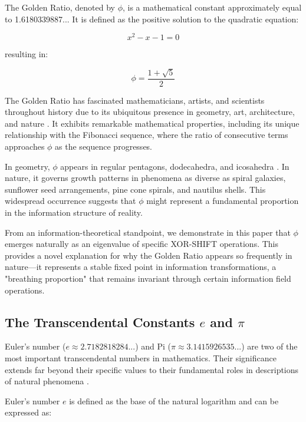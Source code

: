 The Golden Ratio, denoted by $\phi$, is a mathematical constant approximately equal to 1.6180339887... It is defined as the positive solution to the quadratic equation:

\begin{equation}
x^2 - x - 1 = 0
\end{equation}

resulting in:

\begin{equation}
\phi = \frac{1 + \sqrt{5}}{2}
\end{equation}

The Golden Ratio has fascinated mathematicians, artists, and scientists throughout history due to its ubiquitous presence in geometry, art, architecture, and nature \cite{livio2002golden}. It exhibits remarkable mathematical properties, including its unique relationship with the Fibonacci sequence, where the ratio of consecutive terms approaches $\phi$ as the sequence progresses.

In geometry, $\phi$ appears in regular pentagons, dodecahedra, and icosahedra \cite{weyl1952symmetry}. In nature, it governs growth patterns in phenomena as diverse as spiral galaxies, sunflower seed arrangements, pine cone spirals, and nautilus shells. This widespread occurrence suggests that $\phi$ might represent a fundamental proportion in the information structure of reality.

From an information-theoretical standpoint, we demonstrate in this paper that $\phi$ emerges naturally as an eigenvalue of specific XOR-SHIFT operations. This provides a novel explanation for why the Golden Ratio appears so frequently in nature—it represents a stable fixed point in information transformations, a "breathing proportion" that remains invariant through certain information field operations.

\subsection{The Transcendental Constants $e$ and $\pi$}

Euler's number ($e \approx 2.7182818284...$) and Pi ($\pi \approx 3.1415926535...$) are two of the most important transcendental numbers in mathematics. Their significance extends far beyond their specific values to their fundamental roles in descriptions of natural phenomena \cite{havil2003gamma, borwein1987pi}.

Euler's number $e$ is defined as the base of the natural logarithm and can be expressed as:

